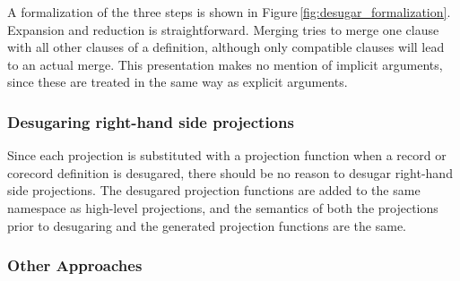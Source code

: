 A formalization of the three steps is shown in Figure\,\ref{fig:desugar_formalization}. Expansion and reduction is straightforward. Merging tries to merge one clause with all other clauses of a definition, although only compatible clauses will lead to an actual merge. This presentation makes no mention of implicit arguments, since these are treated in the same way as explicit arguments.




\subsubsection{Desugaring right-hand side projections}
Since each projection is substituted with a projection function when a record or corecord definition is desugared, there should be no reason to desugar right-hand side projections. The desugared projection functions are added to the same namespace as high-level projections, and the semantics of both the projections prior to desugaring and the generated projection functions are the same.

\subsubsection{Other Approaches}

